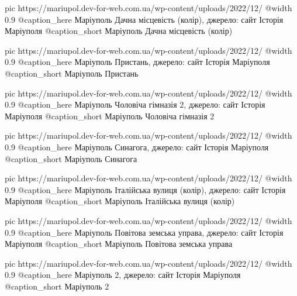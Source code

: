 	pic https://mariupol.dev-for-web.com.ua/wp-content/uploads/2022/12/%
	@width 0.9
	@caption_here Маріуполь Дачна місцевість (колір), джерело: сайт Історія Маріуполя
	@caption_short Маріуполь Дачна місцевість (колір)

	pic https://mariupol.dev-for-web.com.ua/wp-content/uploads/2022/12/%
	@width 0.9
	@caption_here Маріуполь Пристань, джерело: сайт Історія Маріуполя
	@caption_short Маріуполь Пристань

	pic https://mariupol.dev-for-web.com.ua/wp-content/uploads/2022/12/%
	@width 0.9
	@caption_here Маріуполь Чоловіча гімназія 2, джерело: сайт Історія Маріуполя
	@caption_short Маріуполь Чоловіча гімназія 2

	pic https://mariupol.dev-for-web.com.ua/wp-content/uploads/2022/12/%
	@width 0.9
	@caption_here Маріуполь Синагога, джерело: сайт Історія Маріуполя
	@caption_short Маріуполь Синагога

	pic https://mariupol.dev-for-web.com.ua/wp-content/uploads/2022/12/%
	@width 0.9
	@caption_here Маріуполь Італійська вулиця (колір), джерело: сайт Історія Маріуполя
	@caption_short Маріуполь Італійська вулиця (колір)

	pic https://mariupol.dev-for-web.com.ua/wp-content/uploads/2022/12/%
	@width 0.9
	@caption_here Маріуполь Повітова земська управа, джерело: сайт Історія Маріуполя
	@caption_short Маріуполь Повітова земська управа

	pic https://mariupol.dev-for-web.com.ua/wp-content/uploads/2022/12/%
	@width 0.9
	@caption_here Маріуполь 2, джерело: сайт Історія Маріуполя
	@caption_short Маріуполь 2

